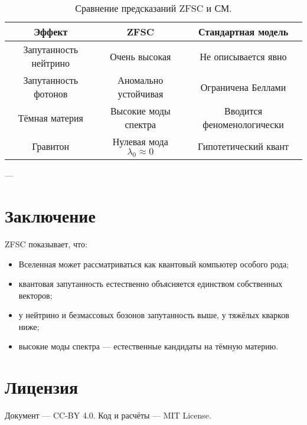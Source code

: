 \documentclass[12pt,a4paper]{article}
\begin{document}
\begin{table}[h!]
\centering
\begin{tabular}{|c|c|c|}
\hline
Эффект & ZFSC & Стандартная модель \\
\hline
Запутанность нейтрино & Очень высокая & Не описывается явно \\
Запутанность фотонов & Аномально устойчивая & Ограничена Беллами \\
Тёмная материя & Высокие моды спектра & Вводится феноменологически \\
Гравитон & Нулевая мода $\lambda_0 \approx 0$ & Гипотетический квант \\
\hline
\end{tabular}
\caption{Сравнение предсказаний ZFSC и СМ.}
\end{table}

---

\section{Заключение}
ZFSC показывает, что:
\begin{itemize}
  \item Вселенная может рассматриваться как квантовый компьютер особого рода;
  \item квантовая запутанность естественно объясняется единством собственных векторов;
  \item у нейтрино и безмассовых бозонов запутанность выше, у тяжёлых кварков ниже;
  \item высокие моды спектра --- естественные кандидаты на тёмную материю.
\end{itemize}

\section*{Лицензия}
Документ --- CC-BY 4.0.  
Код и расчёты --- MIT License.  
\end{document}
